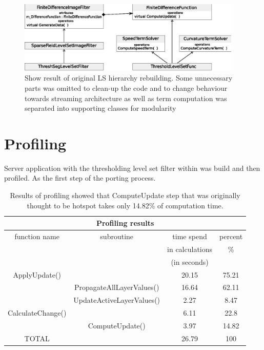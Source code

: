 \begin{figure}
    \centering
    \includegraphics[width=0.95\textwidth]{data/resultingFilter}
    \caption[Resulting level set filter ready to be ported to \mbox{Cell/B.E.}]
    {
Show result of original LS hierarchy rebuilding.
Some unnecessary parts was omitted to clean-up the code and to change behaviour towards streaming architecture as well as term computation was separated into supporting classes for modularity
    }
    \label{fg:resultingFilter}
\end{figure}

\section{Profiling}

Server application with the thresholding level set filter within was build and then profiled. As the first step of the porting process.

\begin{table}
\centering
\begin{tabular}{|c|c|c|c|}
\hline
\multicolumn{4}{|c|}{Profiling results}\\
\hline
function name&subroutine&time spend&percent\\&&in calculations&\%\\&&(in seconds)&\\
\hline
\hline
ApplyUpdate()	&				&	20.15&	75.21\\
\hline
		&PropagateAllLayerValues()	&	16.64&	62.11\\
\hline
		&UpdateActiveLayerValues()	&	2.27&	8.47\\
\hline
CalculateChange()&				&	6.11&	22.8\\
\hline
		&ComputeUpdate()		&	3.97&	14.82\\
\hline
TOTAL		&				&	26.79&	100\\
\hline
\end{tabular}
\par
\caption[Profiling results]
{
  Results of profiling showed that ComputeUpdate step that was originally thought to be hotspot takes only 14.82\% of computation time.
}
\label{tab:profilingresults}
\end{table}

